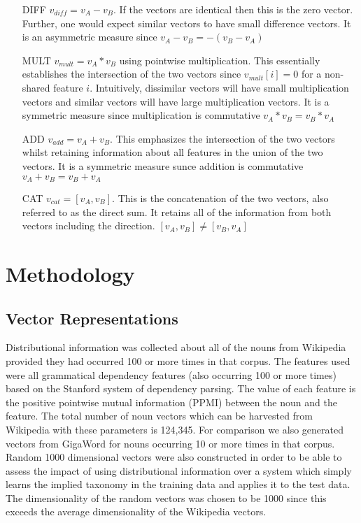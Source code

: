 \documentclass[11pt]{article}
\begin{document}
\begin{itemize}
\item[DIFF]{$v_{diff} = v_A - v_B$.  If the vectors are identical then this is the zero vector.  Further, one would expect similar vectors to have small difference vectors.  It is an asymmetric measure since $v_A - v_B = -(v_B - v_A)$ }
\item[MULT]{$v_{mult} = v_A * v_B$ using pointwise multiplication.  This essentially establishes the intersection of the two vectors since $v_{mult}[i] = 0$ for a non-shared feature $i$.   Intuitively,  dissimilar vectors will have small multiplication vectors and similar vectors will have large multiplication vectors.  It is a symmetric measure since multiplication is commutative $v_A * v_B = v_B * v_A$ }
\item[ADD]{$v_{add} = v_A + v_B$.  This emphasizes the intersection of the two vectors whilst retaining information about all features in the union of the two vectors.  It is a symmetric measure sunce addition is commutative $v_A + v_B = v_B + v_A$}
\item[CAT]{$v_{cat} = [v_A,v_B]$.  This is the concatenation of the two vectors, also referred to as the direct sum.  It retains all of the information from both vectors including the direction.    $[v_A,v_B] \neq [v_B,v_A]$}
\end{itemize}

\section{Methodology}

\subsection{Vector Representations}

Distributional information was collected about all of the nouns from Wikipedia provided they had occurred 100 or more times in that corpus.  The features used were all grammatical dependency features (also occurring 100 or more times) based on the Stanford system of dependency parsing.  The value of each feature is the positive pointwise mutual information (PPMI) between the noun and the feature. The total number of noun vectors which can be harvested from Wikipedia with these parameters is 124,345.   For comparison we also generated vectors from GigaWord for nouns occurring 10 or more times in that corpus.   Random 1000 dimensional vectors were also constructed in order to be able to assess the impact of using distributional information over a system which simply learns the implied taxonomy in the training data and applies it to the test data.  The dimensionality of the random vectors was chosen to be 1000 since this exceeds the average dimensionality of the Wikipedia vectors.
\end{document}
